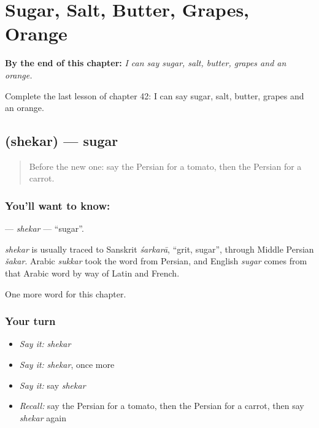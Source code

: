 
\chapter{Sugar, Salt, Butter, Grapes, Orange}
\label{ch:fa-sugar-salt-butter-grapes-orange}

\begin{chapteropening}
\textbf{By the end of this chapter:} \emph{I can say sugar, salt, butter, grapes and an orange.}

Complete the last lesson of chapter 42: I can say sugar, salt, butter, grapes and an orange.
\end{chapteropening}

\section[\texorpdfstring{\fa{شکر} (shekar)}{شکر (shekar)}]{ (shekar) — sugar}

\label{lesson:FA-C42-shekar}



\begin{quote}
Before the new one: say the Persian for a tomato, then the Persian for a carrot.
\end{quote}

\subsection*{You'll want to know: }
\textbf{} — \emph{shekar} — \textquotedblleft{}sugar\textquotedblright{}.

\begin{cousinweb}
\emph{shekar} is usually traced to Sanskrit \emph{śarkarā}, \textquotedblleft{}grit, sugar\textquotedblright{}, through Middle Persian \emph{šakar}. Arabic \emph{sukkar} took the word from Persian, and English \emph{sugar} comes from that Arabic word by way of Latin and French.
\end{cousinweb}

\begin{grammarlens}[title={What you've built}]
One more word for this chapter.
\end{grammarlens}

\subsection*{Your turn}
\begin{itemize}
\raggedright
  \item \emph{Say it:} \emph{shekar}
  \item \emph{Say it:} \emph{shekar}, once more
  \item \emph{Say it:} say \emph{shekar}
  \item \emph{Recall:} say the Persian for a tomato, then the Persian for a carrot, then say \emph{shekar} again
\end{itemize}

